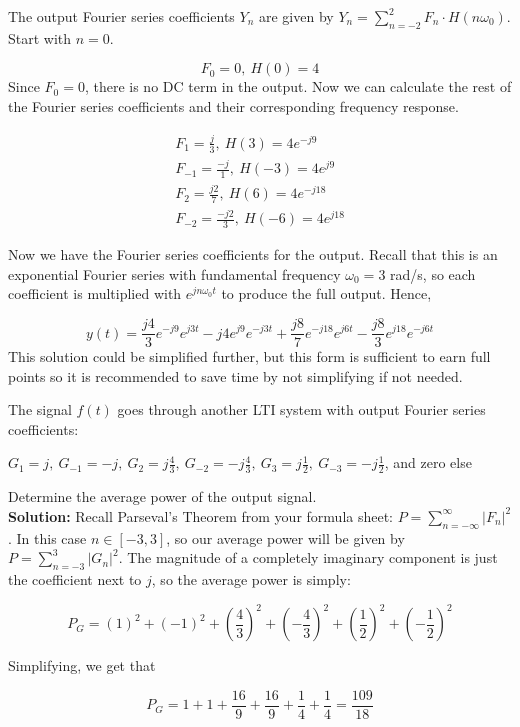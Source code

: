 \documentclass[12pt,letterpaper, onecolumn]{exam}
\begin{document}
\begin{enumerate}
\begin{questions}
The output Fourier series coefficients $Y_n$ are given by $Y_n = \sum_{n=-2}^{2} F_n \cdot H(n\omega_0)$. Start with $n=0$.

\[
F_0 = 0,\ H(0) = 4
\]
Since $F_0 = 0$, there is no DC term in the output. Now we can calculate the rest of the Fourier series coefficients and their corresponding frequency response.

\begin{align*}
F_1 = \frac{j}{3},\ H(3) = 4e^{-j9} \\
F_{-1} = \frac{-j}{1},\ H(-3) = 4e^{j9} \\
F_2 = \frac{j2}{7},\ H(6) = 4e^{-j18} \\
F_{-2} = \frac{-j2}{3},\ H(-6) = 4e^{j18}
\end{align*}

Now we have the Fourier series coefficients for the output. Recall that this is an exponential Fourier series with fundamental frequency $\omega_0 = 3$ rad/s, so each coefficient is multiplied with $e^{jn\omega_0t}$ to produce the full output. Hence,

\[
\boxed{y(t) = \frac{j4}{3}e^{-j9}e^{j3t} - j4e^{j9}e^{-j3t} + \frac{j8}{7}e^{-j18}e^{j6t}- \frac{j8}{3}e^{j18}e^{-j6t}}
\]
This solution could be simplified further, but this form is sufficient to earn full points so it is recommended to save time by not simplifying if not needed.

\newpage


\question The signal $f(t)$ goes through another LTI system with output Fourier series coefficients:
\begin{center}
    $G_1 = j,\ G_{-1} = -j,\ G_2 = j\frac{4}{3},\ G_{-2} = -j\frac{4}{3},\ G_3 = j\frac{1}{2},\ G_{-3} = -j\frac{1}{2}$, and zero else
\end{center}
Determine the average power of the output signal. \\

\textbf{Solution: } Recall Parseval's Theorem from your formula sheet: $P = \sum_{n=-\infty}^{\infty}|F_n|^2$. In this case $n \in [-3,3]$, so our average power will be given by $P = \sum_{n=-3}^{3}|G_n|^2$. The magnitude of a completely imaginary component is just the coefficient next to $j$, so the average power is simply: 

\[
P_G = (1)^2+(-1)^2+(\frac{4}{3})^2+(-\frac{4}{3})^2+(\frac{1}{2})^2+(-\frac{1}{2})^2
\]

Simplifying, we get that 

\[
P_G = 1+1+\frac{16}{9}+\frac{16}{9}+\frac{1}{4}+\frac{1}{4} = \boxed{\frac{109}{18}}
\]


\end{questions}
\end{enumerate}
\end{document}
